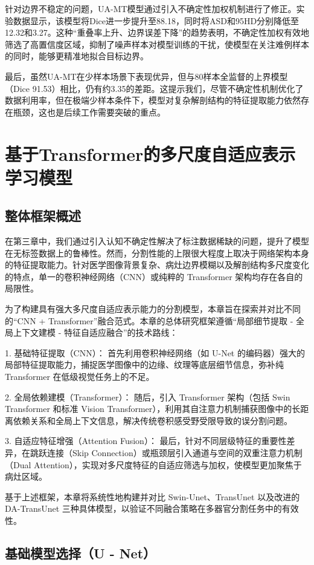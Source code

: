 \documentclass{xduugthesis}
\begin{document}
针对边界不稳定的问题，UA-MT模型通过引入不确定性加权机制进行了修正。实验数据显示，该模型将Dice进一步提升至88.18，同时将ASD和95HD分别降低至12.32和3.27。这种“重叠率上升、边界误差下降”的趋势表明，不确定性加权有效地筛选了高置信度区域，抑制了噪声样本对模型训练的干扰，使模型在关注难例样本的同时，能够更精准地拟合目标边界。

最后，虽然UA-MT在少样本场景下表现优异，但与80样本全监督的上界模型（Dice 91.53）相比，仍有约3.35的差距。这提示我们，尽管不确定性机制优化了数据利用率，但在极端少样本条件下，模型对复杂解剖结构的特征提取能力依然存在瓶颈，这也是后续工作需要突破的重点。

\chapter{基于Transformer的多尺度自适应表示学习模型}
\section{整体框架概述}
在第三章中，我们通过引入认知不确定性解决了标注数据稀缺的问题，提升了模型在无标签数据上的鲁棒性。然而，分割性能的上限很大程度上取决于网络架构本身的特征提取能力。针对医学图像背景复杂、病灶边界模糊以及解剖结构多尺度变化的特点，单一的卷积神经网络（CNN）或纯粹的 Transformer 架构均存在各自的局限性。

为了构建具有强大多尺度自适应表示能力的分割模型，本章旨在探索并对比不同的“CNN + Transformer”融合范式。本章的总体研究框架遵循“局部细节提取 - 全局上下文建模 - 特征自适应融合”的技术路线：

1. 基础特征提取（CNN）： 首先利用卷积神经网络（如 U-Net 的编码器）强大的局部特征提取能力，捕捉医学图像中的边缘、纹理等底层细节信息，弥补纯 Transformer 在低级视觉任务上的不足。

2. 全局依赖建模（Transformer）： 随后，引入 Transformer 架构（包括 Swin Transformer 和标准 Vision Transformer），利用其自注意力机制捕获图像中的长距离依赖关系和全局上下文信息，解决传统卷积感受野受限导致的误分割问题。

3. 自适应特征增强（Attention Fusion）： 最后，针对不同层级特征的重要性差异，在跳跃连接（Skip Connection）或瓶颈层引入通道与空间的双重注意力机制（Dual Attention），实现对多尺度特征的自适应筛选与加权，使模型更加聚焦于病灶区域。

基于上述框架，本章将系统性地构建并对比 Swin-Unet、TransUnet 以及改进的 DA-TransUnet 三种具体模型，以验证不同融合策略在多器官分割任务中的有效性。

\section{基础模型选择（U - Net）}
\end{document}
